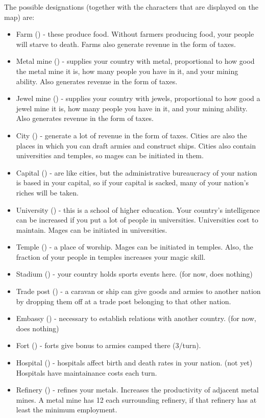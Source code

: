 The possible designations (together with the characters that are
displayed on the map) are:
\begin{itemize}
\item
Farm () - these produce food.  Without farmers producing food,
your people will starve to death.  Farms also generate revenue in the
form of taxes.
\item
Metal mine () - supplies your country with metal, proportional to
how good the metal mine it is, how many people you have in it, and your
mining ability.  Also generates revenue in the form of taxes.
\item
Jewel mine () - supplies your country with jewels, proportional to
how good a jewel mine it is, how many people you have in it, and your
mining ability.  Also generates revenue in the form of taxes.
\item
City () - generate a lot of revenue in the form of taxes.
Cities are also the places in which you can draft armies and construct
ships.  Cities also contain universities and temples, so mages can be
initiated in them.
\item
Capital () - are like cities, but the administrative bureaucracy
of your nation is based in your capital, so if your capital is
sacked, many of your nation's riches will be taken.
\item
University () - this is a school of higher education.  Your
country's intelligence can be increased if you put a lot of people in
universities.  Universities cost to maintain.  Mages can be initiated
in universities.
\item
Temple (\kbd{+}) - a place of worship.  Mages can be initiated in
temples.  Also, the fraction of your people in temples increases your
magic skill.
\item
Stadium () - your country holds sports events here.  (for now,
does nothing)
\item
Trade post () - a caravan or ship can give goods and armies to
another nation by dropping them off at a trade post belonging to that
other nation.
\item
Embassy () - necessary to establish relations with another
country.  (for now, does nothing)
\item
Fort (\kbd{!}) - forts give bonus to armies camped there (3/turn).
\item
Hospital () - hospitals affect birth and death rates in your
nation. (not yet) Hospitals have maintainance costs each turn.
\item
Refinery () - refines your metals.  Increases the productivity
of adjacent metal mines.  A metal mine has 12%
each surrounding refinery, if that refinery has at least the minimum
employment.
\end{itemize}

